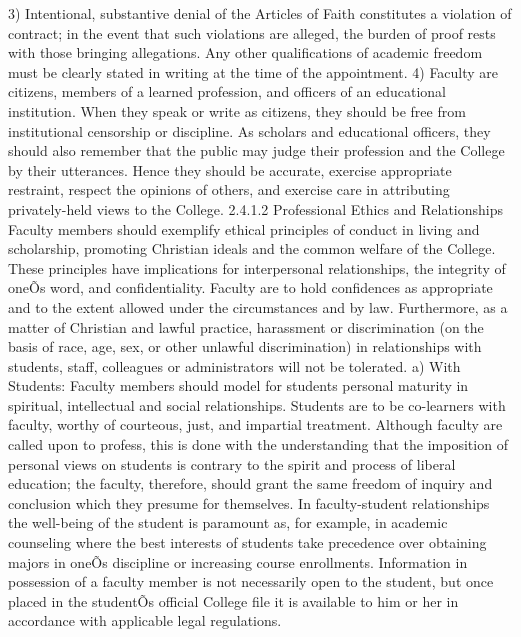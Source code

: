 \documentclass[letterpaper, 11pt]{article}
\begin{document}
3) Intentional, substantive denial of the Articles of Faith constitutes a violation of contract; in the event that such violations are alleged, the burden of proof rests with those bringing allegations.  Any other qualifications of academic freedom must be clearly stated in writing at the time of the appointment.
4) Faculty are citizens, members of a learned profession, and officers of an educational institution.  When they speak or write as citizens, they should be free from institutional censorship or discipline.  As scholars and educational officers, they should also remember that the public may judge their profession and the College by their utterances.  Hence they should be accurate, exercise appropriate restraint, respect the opinions of others, and exercise care in attributing privately-held views to the College.
2.4.1.2 Professional Ethics and Relationships
   Faculty members should exemplify ethical principles of conduct in living and scholarship, promoting Christian ideals and the common welfare of the College.  These principles have implications for interpersonal relationships, the integrity of oneÕs word, and confidentiality.  Faculty are to hold confidences as appropriate and to the extent allowed under the circumstances and by law.  Furthermore, as a matter of Christian and lawful practice, harassment or discrimination (on the basis of race, age, sex, or other unlawful discrimination) in relationships with students, staff, colleagues or administrators will not be tolerated.
a) With Students:  Faculty members should model for students personal maturity in spiritual, intellectual and social relationships.  Students are to be co-learners with faculty, worthy of courteous, just, and impartial treatment.  Although faculty are called upon to profess, this is done with the understanding that the imposition of personal views on students is contrary to the spirit and process of liberal education; the faculty, therefore, should grant the same freedom of inquiry and conclusion which they presume for themselves.  In faculty-student relationships the well-being of the student is paramount as, for example, in academic counseling where the best interests of students take precedence over obtaining majors in oneÕs discipline or increasing course enrollments.  Information in possession of a faculty member is not necessarily open to the student, but once placed in the studentÕs official College file it is available to him or her in accordance with applicable legal regulations.
\end{document}
